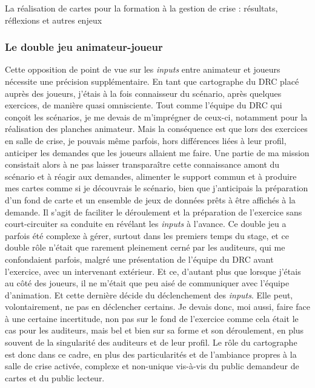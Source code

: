 \documentclass[10pt,a4paper]{report} %
\begin{document}
\begin{part}{La réalisation de cartes pour la formation à la gestion de crise : résultats, réflexions et autres enjeux}
\subsubsection{Le double jeu animateur-joueur}
Cette opposition de point de vue sur les \textit{inputs} entre animateur et joueurs nécessite une précision supplémentaire. En tant que cartographe du DRC placé auprès des joueurs, j’étais à la fois connaisseur du scénario, après quelques exercices, de manière quasi omnisciente. Tout comme l’équipe du DRC qui conçoit les scénarios, je me devais de m’imprégner de ceux-ci, notamment pour la réalisation des planches animateur. Mais la conséquence est que lors des exercices en salle de crise, je pouvais même parfois, hors différences liées à leur profil, anticiper les demandes que les joueurs allaient me faire. Une partie de ma mission consistait alors à ne pas laisser transparaître cette connaissance amont du scénario et à réagir aux demandes, alimenter le support commun et à produire mes cartes comme si je découvrais le scénario, bien que j’anticipais la préparation d’un fond de carte et un ensemble de jeux de données prêts à être affichés à la demande. Il s’agit de faciliter le déroulement et la préparation de l’exercice sans court-circuiter sa conduite en révélant les \textit{inputs} à l’avance. Ce double jeu a parfois été complexe à gérer, surtout dans les premiers temps du stage, et ce double rôle n’était que rarement pleinement cerné par les auditeurs, qui me confondaient parfois, malgré une présentation de l’équipe du DRC avant l’exercice, avec un intervenant extérieur. Et ce, d’autant plus que lorsque j’étais au côté des joueurs, il ne m’était que peu aisé de communiquer avec l’équipe d’animation. Et cette dernière décide du déclenchement des \textit{inputs}. Elle peut, volontairement, ne pas en déclencher certains. Je devais donc, moi aussi, faire face à une certaine incertitude, non pas sur le fond de l’exercice comme cela était le cas pour les auditeurs, mais bel et bien sur sa forme et son déroulement, en plus souvent de la singularité des auditeurs et de leur profil. Le rôle du cartographe est donc dans ce cadre, en plus des particularités et de l’ambiance propres à la salle de crise activée, complexe et non-unique vis-à-vis du public demandeur de cartes et du public lecteur. 


\end{part}
\end{document}
